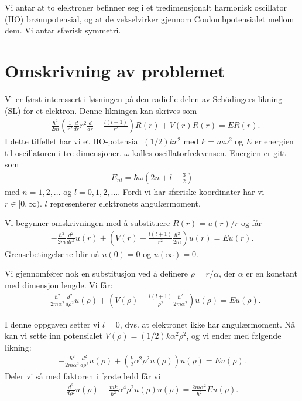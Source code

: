\documentclass[11pt]{article}
\begin{document}
Vi antar at to elektroner befinner seg i et tredimensjonalt harmonisk
oscillator (HO) brønnpotensial, og at de vekselvirker gjennom
Coulombpotensialet mellom dem. Vi antar sfærisk symmetri. 

\section{Omskrivning av problemet}
Vi er først interessert i løsningen på den radielle delen av
Schödingers likning (SL) for et elektron. Denne likningen kan skrives
som 
\begin{align}
  -\frac{ \hbar^2 }{ 2m }\left( \frac{ 1 }{ r^2 }\frac{ d }{ dr }r^2
  \frac{ d }{ dr } - \frac{ l(l+1) }{ r^2 }   \right) R(r) + V(r)R(r)
  = ER(r).\label{eq:SL}
\end{align}
I dette tilfellet har vi et HO-potensial $(1/2)kr^2$ med $k=m\omega^2$
og $E$ er energien til oscillatoren i tre dimensjoner. $\omega$ kalles
oscillatorfrekvensen. Energien er gitt som 
\begin{align}
  E_{nl} = \hbar\omega\left(2n+l+\frac{ 3 }{ 2 }\right)\label{eq:Energy}
\end{align}
med $n=1,2,\dots$ og $l=0,1,2,\dots$. Fordi vi har sfæriske
koordinater har vi $r\in [0,\infty)$. $l$ representerer elektronets
angulærmoment. 

Vi begynner omskrivningen med å substituere $R(r) = u(r)/r$ og får 
\begin{align*}
  -\frac{ \hbar^2 }{ 2m }\frac{ d^2 }{ dr^2 }u(r) + \left(V(r) +
  \frac{ l(l+1) }{ r^2 }\frac{ \hbar^2 }{ 2m }\right)u(r) = Eu(r).
\end{align*}
Grensebetingelsene blir nå $u(0)=0$ og $u(\infty)=0$. 

Vi gjennomfører nok en substitusjon ved å definere $\rho = r/\alpha$,
der $\alpha$ er en konstant med dimensjon lengde. Vi får:
\begin{align*}
  -\frac{ \hbar^2 }{ 2m\alpha^2 }\frac{ d^2 }{ d\rho^2 }u(\rho) +
  \left(V(\rho) + \frac{ l(l+1) }{ \rho^2 }\frac{ \hbar^2 }{
  2m\alpha^2 }\right)u(\rho) = Eu(\rho).
\end{align*}

I denne oppgaven setter vi $l=0$, dvs. at elektronet ikke har
angulærmoment. Nå kan vi sette inn potensialet $V(\rho) =
(1/2)k\alpha^2\rho^2$, og vi ender med følgende likning:
\begin{align*}
   -\frac{ \hbar^2 }{ 2m\alpha^2 }\frac{ d^2 }{ d\rho^2 }u(\rho) +
  \left( \frac{ k }{ 2 }\alpha^2\rho^2u(\rho) \right)u(\rho) = Eu(\rho).
\end{align*}
Deler vi så med faktoren i første ledd får vi
\begin{align*}
    \frac{ d^2 }{ d\rho^2 }u(\rho) + \frac{ mk }{ \hbar^2
  }\alpha^4\rho^2u(\rho) u(\rho) = \frac{ 2m\alpha^2 }{ \hbar^2 }Eu(\rho).
\end{align*}
\end{document}
